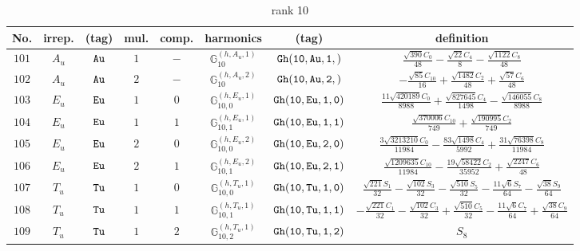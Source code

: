 \documentclass[fleqn,8pt]{jsarticle}
\begin{document}
\begin{table}[ht!]
\begin{center}
\caption{rank 10}
\renewcommand{\arraystretch}{1.3}
\begin{tabular}{cccccccc} \hline \hline
No. & irrep. & (tag) & mul. & comp. & harmonics & (tag) & definition \\ \hline
$ 101 $ & $ A_{u} $ & $ {\tt Au} $ & $ 1 $ & $ - $ & $ \mathbb{G}_{10}^{(h,A_{u},1)} $ & $ {\tt Gh(10,Au,1,)} $ & $ \frac{\sqrt{390} C_{0}}{48} - \frac{\sqrt{22} C_{4}}{8} - \frac{\sqrt{1122} C_{8}}{48} $ \\
$ 102 $ & $ A_{u} $ & $ {\tt Au} $ & $ 2 $ & $ - $ & $ \mathbb{G}_{10}^{(h,A_{u},2)} $ & $ {\tt Gh(10,Au,2,)} $ & $ - \frac{\sqrt{85} C_{10}}{16} + \frac{\sqrt{1482} C_{2}}{48} + \frac{\sqrt{57} C_{6}}{48} $ \\
$ 103 $ & $ E_{u} $ & $ {\tt Eu} $ & $ 1 $ & $ 0 $ & $ \mathbb{G}_{10,0}^{(h,E_{u},1)} $ & $ {\tt Gh(10,Eu,1,0)} $ & $ \frac{11 \sqrt{420189} C_{0}}{8988} + \frac{\sqrt{827645} C_{4}}{1498} - \frac{\sqrt{146055} C_{8}}{8988} $ \\
$ 104 $ & $ E_{u} $ & $ {\tt Eu} $ & $ 1 $ & $ 1 $ & $ \mathbb{G}_{10,1}^{(h,E_{u},1)} $ & $ {\tt Gh(10,Eu,1,1)} $ & $ \frac{\sqrt{370006} C_{10}}{749} + \frac{\sqrt{190995} C_{2}}{749} $ \\
$ 105 $ & $ E_{u} $ & $ {\tt Eu} $ & $ 2 $ & $ 0 $ & $ \mathbb{G}_{10,0}^{(h,E_{u},2)} $ & $ {\tt Gh(10,Eu,2,0)} $ & $ \frac{3 \sqrt{3213210} C_{0}}{11984} - \frac{83 \sqrt{1498} C_{4}}{5992} + \frac{31 \sqrt{76398} C_{8}}{11984} $ \\
$ 106 $ & $ E_{u} $ & $ {\tt Eu} $ & $ 2 $ & $ 1 $ & $ \mathbb{G}_{10,1}^{(h,E_{u},2)} $ & $ {\tt Gh(10,Eu,2,1)} $ & $ \frac{\sqrt{1209635} C_{10}}{11984} - \frac{19 \sqrt{58422} C_{2}}{35952} + \frac{\sqrt{2247} C_{6}}{48} $ \\
$ 107 $ & $ T_{u} $ & $ {\tt Tu} $ & $ 1 $ & $ 0 $ & $ \mathbb{G}_{10,0}^{(h,T_{u},1)} $ & $ {\tt Gh(10,Tu,1,0)} $ & $ \frac{\sqrt{221} S_{1}}{32} - \frac{\sqrt{102} S_{3}}{32} - \frac{\sqrt{510} S_{5}}{32} - \frac{11 \sqrt{6} S_{7}}{64} - \frac{\sqrt{38} S_{9}}{64} $ \\
$ 108 $ & $ T_{u} $ & $ {\tt Tu} $ & $ 1 $ & $ 1 $ & $ \mathbb{G}_{10,1}^{(h,T_{u},1)} $ & $ {\tt Gh(10,Tu,1,1)} $ & $ - \frac{\sqrt{221} C_{1}}{32} - \frac{\sqrt{102} C_{3}}{32} + \frac{\sqrt{510} C_{5}}{32} - \frac{11 \sqrt{6} C_{7}}{64} + \frac{\sqrt{38} C_{9}}{64} $ \\
$ 109 $ & $ T_{u} $ & $ {\tt Tu} $ & $ 1 $ & $ 2 $ & $ \mathbb{G}_{10,2}^{(h,T_{u},1)} $ & $ {\tt Gh(10,Tu,1,2)} $ & $ S_{8} $ \\

\end{tabular}
\end{center}
\end{table}
\end{document}
